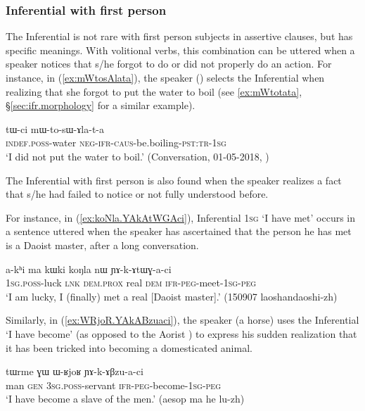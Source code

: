 \subsubsection{Inferential with first person} \label{sec:inf.1person}
The Inferential is not rare with first person subjects in assertive clauses, but has specific meanings.  With volitional verbs, this combination can be uttered when a speaker notices that s/he forgot to do or did not properly do an action. For instance, in (\ref{ex:mWtosAlata}), the speaker () selects the Inferential when realizing that she forgot to put the water to boil (see \ref{ex:mWtotata}, §\ref{sec:ifr.morphology} for a similar example).

\begin{exe}
\ex \label{ex:mWtosAlata}
\gll tɯ-ci mɯ-to-sɯ-ɤla-t-a \\
\textsc{indef}.\textsc{poss}-water \textsc{neg}-\textsc{ifr}-\textsc{caus}-be.boiling-\textsc{pst}:\textsc{tr}-\textsc{1sg} \\
\glt `I did not put the water to boil.' (Conversation, 01-05-2018, )
\end{exe}

The Inferential with first person is also found when the speaker realizes a fact that s/he had failed to notice or not fully understood before.

For instance, in (\ref{ex:koNla.YAkAtWGAci}), Inferential \textsc{1sg}  `I have met' occurs in a sentence uttered when the speaker has ascertained that the person he has met is a Daoist master, after a long conversation.  

\begin{exe}
\ex \label{ex:koNla.YAkAtWGAci}
\gll  a-kʰi ma kɯki koŋla nɯ ɲɤ-k-ɤtɯɣ-a-ci \\
\textsc{1sg}.\textsc{poss}-luck \textsc{lnk} \textsc{dem}.\textsc{prox} real \textsc{dem} \textsc{ifr}-\textsc{peg}-meet-\textsc{1sg}-\textsc{peg} \\
\glt `I am lucky, I (finally) met a real [Daoist master].' (150907 laoshandaoshi-zh)
\end{exe}

Similarly, in (\ref{ex:WRjoR.YAkABzuaci}), the speaker (a horse) uses the Inferential  `I have become' (as opposed to the Aorist ) to express his sudden realization that it has been tricked into becoming a domesticated animal.

\begin{exe}
\ex \label{ex:WRjoR.YAkABzuaci}
\gll tɯrme ɣɯ ɯ-ʁjoʁ ɲɤ-k-ɤβzu-a-ci \\
man \textsc{gen} \textsc{3sg}.\textsc{poss}-servant \textsc{ifr}-\textsc{peg}-become-\textsc{1sg}-\textsc{peg} \\
\glt `I have become a slave of the men.' (aesop ma he lu-zh)
\end{exe}

